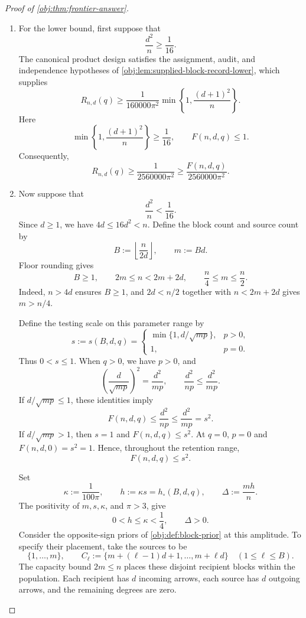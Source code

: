 \begin{proof}[Proof of \cref{obj:thm:frontier-answer}]
\begin{enumerate}
\item For the lower bound, first suppose that
\[
\frac{d^2}{n}\ge\frac1{16}.
\]
The canonical product design satisfies the assignment, audit, and independence hypotheses of \cref{obj:lem:supplied-block-record-lower}, which supplies
\[
R_{n,d}(q)\ge
\frac1{160000\pi^2}
\min\left\{1,\frac{(d+1)^2}{n}\right\}.
\]
Here
\[
\min\left\{1,\frac{(d+1)^2}{n}\right\}\ge\frac1{16},
\qquad
F(n,d,q)\le1.
\]
Consequently,
\[
R_{n,d}(q)
\ge\frac1{2560000\pi^2}
\ge\frac{F(n,d,q)}{2560000\pi^2}.
\]

\item Now suppose that
\[
\frac{d^2}{n}<\frac1{16}.
\]
Since \(d\ge1\), we have \(4d\le16d^2<n\). Define the block count and source count by
\[
B:=\left\lfloor\frac{n}{2d}\right\rfloor,
\qquad
m:=Bd.
\]
Floor rounding gives
\[
B\ge1,
\qquad
2m\le n<2m+2d,
\qquad
\frac n4\le m\le\frac n2.
\]
Indeed, \(n>4d\) ensures \(B\ge1\), and \(2d<n/2\) together with
\(n<2m+2d\) gives \(m>n/4\).

Define the testing scale on this parameter range by
\[
s:=s(B,d,q)=
\begin{cases}
\min\{1,d/\sqrt{mp}\},&p>0,\\
1,&p=0.
\end{cases}
\]
Thus \(0<s\le1\). When \(q>0\), we have \(p>0\), and
\[
\left(\frac d{\sqrt{mp}}\right)^2=\frac{d^2}{mp},
\qquad
\frac{d^2}{np}\le\frac{d^2}{mp}.
\]
If \(d/\sqrt{mp}\le1\), these identities imply
\[
F(n,d,q)\le\frac{d^2}{np}\le\frac{d^2}{mp}=s^2.
\]
If \(d/\sqrt{mp}>1\), then \(s=1\) and \(F(n,d,q)\le s^2\).
At \(q=0\), \(p=0\) and \(F(n,d,0)=s^2=1\). Hence, throughout the retention range,
\[
F(n,d,q)\le s^2.
\]

Set
\[
\kappa:=\frac1{100\pi},
\qquad
h:=\kappa s=h_\circ(B,d,q),
\qquad
\Delta:=\frac{mh}{n}.
\]
The positivity of \(m,s,\kappa\), and \(\pi>3\), give
\[
0<h\le\kappa<\frac14,
\qquad
\Delta>0.
\]
Consider the opposite-sign priors of \cref{obj:def:block-prior} at this amplitude. To specify their placement, take the sources to be
\[
\{1,\ldots,m\},
\qquad
C_\ell:=\{m+(\ell-1)d+1,\ldots,m+\ell d\}
\quad(1\le\ell\le B).
\]
The capacity bound \(2m\le n\) places these disjoint recipient blocks within the population. Each recipient has \(d\) incoming arrows, each source has \(d\) outgoing arrows, and the remaining degrees are zero.


\end{enumerate}
\end{proof}
